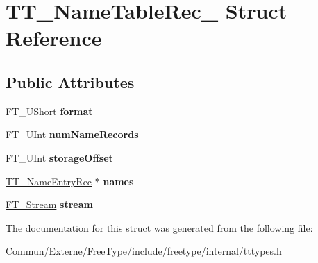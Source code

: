 \hypertarget{struct_t_t___name_table_rec__}{}\section{T\+T\+\_\+\+Name\+Table\+Rec\+\_\+ Struct Reference}
\label{struct_t_t___name_table_rec__}
\subsection*{Public Attributes}
\begin{DoxyCompactItemize}
\item 
F\+T\+\_\+\+U\+Short {\bfseries format}\hypertarget{struct_t_t___name_table_rec___a762c5431cbe285cb7153bb5650710fb0}{}\label{struct_t_t___name_table_rec___a762c5431cbe285cb7153bb5650710fb0}

\item 
F\+T\+\_\+\+U\+Int {\bfseries num\+Name\+Records}\hypertarget{struct_t_t___name_table_rec___a5b565d940b9d02bb69cd19da5cda61b8}{}\label{struct_t_t___name_table_rec___a5b565d940b9d02bb69cd19da5cda61b8}

\item 
F\+T\+\_\+\+U\+Int {\bfseries storage\+Offset}\hypertarget{struct_t_t___name_table_rec___a4ed1f4e78e39b2e206411e9ea4d23801}{}\label{struct_t_t___name_table_rec___a4ed1f4e78e39b2e206411e9ea4d23801}

\item 
\hyperlink{struct_t_t___name_entry_rec__}{T\+T\+\_\+\+Name\+Entry\+Rec} $\ast$ {\bfseries names}\hypertarget{struct_t_t___name_table_rec___a693aed17954386eb8fb5fd7f69d5b551}{}\label{struct_t_t___name_table_rec___a693aed17954386eb8fb5fd7f69d5b551}

\item 
\hyperlink{struct_f_t___stream_rec__}{F\+T\+\_\+\+Stream} {\bfseries stream}\hypertarget{struct_t_t___name_table_rec___a97109aec8cd7ca13f6627f3fee15d48d}{}\label{struct_t_t___name_table_rec___a97109aec8cd7ca13f6627f3fee15d48d}

\end{DoxyCompactItemize}


The documentation for this struct was generated from the following file\+:\begin{DoxyCompactItemize}
\item 
Commun/\+Externe/\+Free\+Type/include/freetype/internal/tttypes.\+h\end{DoxyCompactItemize}
